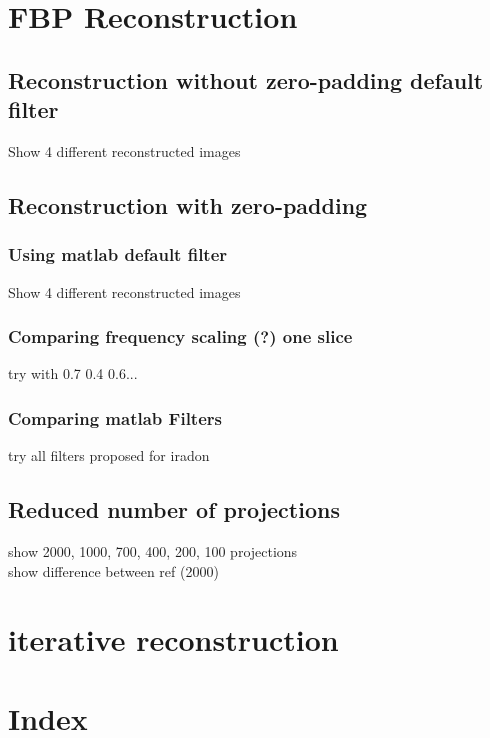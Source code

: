 \documentclass[10pt,a4paper,titlepage]{article}
\begin{document}
	
\section{FBP Reconstruction}
	\subsection{Reconstruction without zero-padding default filter}
		Show 4 different reconstructed images
	\subsection{Reconstruction with zero-padding}
		\subsubsection{Using matlab default filter}
			Show 4 different reconstructed images
		\subsubsection{Comparing frequency scaling (?) one slice}
			try with 0.7 0.4 0.6...
		\subsubsection{Comparing matlab Filters}
			try all filters proposed for iradon
	\subsection{Reduced number of projections}
		show 2000, 1000, 700, 400, 200, 100 projections\\
		show difference between ref (2000)
		
\section{iterative reconstruction}	

\section{Index}
\end{document}
